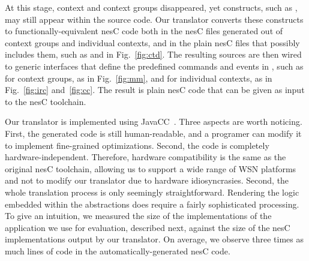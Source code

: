 At this stage, context and context groups disappeared, yet \conesc
constructs, such as , may still appear within the
source code. Our translator converts these constructs to
functionally-equivalent nesC code both in the nesC files generated out
of context groups and individual contexts, and in the plain nesC files
that possibly includes them, such as  and  in
Fig.~\ref{fig:ctd}. The resulting sources are then wired to generic
interfaces that define the predefined commands and events in \conesc,
such as  for context groups, as in
Fig.~\ref{fig:mm}, and  for individual
contexts, as in Fig.~\ref{fig:irc} and~\ref{fig:cc}. The result is
plain nesC code that can be given as input to the nesC toolchain.




Our translator is implemented using JavaCC~\cite{javacc}. Three aspects
are worth noticing. First, the generated code is still human-readable, and a programer can modify it to implement fine-grained optimizations. Second, the code is completely
hardware-independent. Therefore, hardware compatibility is the same as
the original nesC toolchain, allowing us to support a wide range of
WSN platforms and not to modify our translator due to hardware
idiosyncrasies. Second, the whole translation process is only
seemingly straightforward. Rendering the logic embedded within the
\conesc abstractions does require a fairly sophisticated
processing. To give an intuition, we measured the size of the \conesc
implementations of the application we use for evaluation, described
next, against the size of the nesC implementations output by our
translator. On average, we observe three times as much lines of code
in the automatically-generated nesC code.

